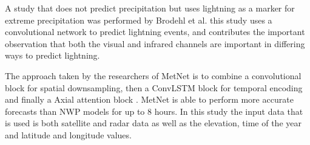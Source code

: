 A study that does not predict precipitation but uses lightning as a marker for extreme precipitation was performed by Brodehl et al. \cite{predictionLightning} this study uses a convolutional network to predict lightning events, and contributes the important observation that both the visual and infrared channels are important in differing ways to predict lightning.
\smallskip

The approach taken by the researchers of MetNet \cite{sønderby2020metnet} is to combine a convolutional block for spatial downsampling, then a ConvLSTM block for temporal encoding and finally a Axial attention block \cite{vaswani2017attention}. MetNet is able to perform more accurate forecasts than NWP models for up to 8 hours. In this study the input data that is used is both satellite and radar data as well as the elevation, time of the year and latitude and longitude values.